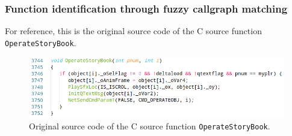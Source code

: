 \begin{frame}
	\frametitle{Function identification through fuzzy callgraph matching}

	For reference, this is the original source code of the C source function \texttt{OperateStoryBook}.

	\begin{figure}[htbp]
		\centering
		\includegraphics[width=0.8\linewidth]{inc/example/source_func_light.png}
		\caption{Original source code of the C source function \texttt{OperateStoryBook}.}
	\end{figure}
\end{frame}
